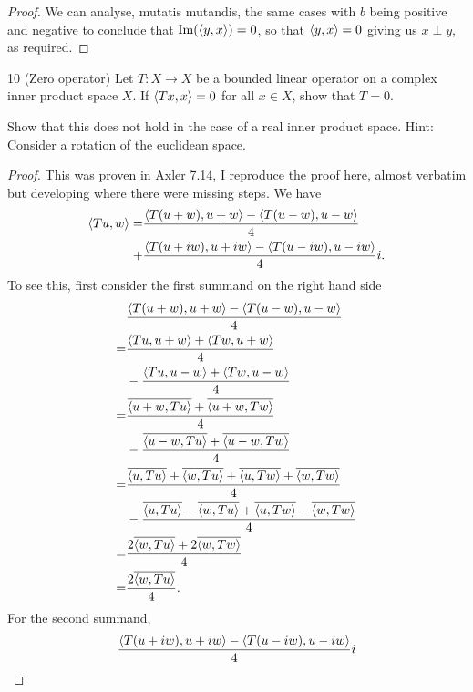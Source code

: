 \begin{proof}
We can analyse, mutatis mutandis, the same cases with $b$ being positive and negative to conclude that $\text{Im}(\langle y,x\rangle)=0$, so that $\langle y,x\rangle=0$ giving us $x\perp y$, as required.
\end{proof}

\begin{exercise}{10 (Zero operator)}
Let $T:X\to X$ be a bounded linear operator on a complex inner product space $X$.
If $\langle Tx,x\rangle=0$ for all $x\in X$, show that $T=0$.

Show that this does not hold in the case of a real inner product space.
Hint: Consider a rotation of the euclidean space.
\end{exercise}
\begin{proof}
This was proven in Axler 7.14, I reproduce the proof here, almost verbatim but developing where there were missing steps.
We have
\begin{align*}
    \langle Tu,w\rangle 
    =& \frac{\langle T(u+w), u+w\rangle-\langle T(u-w), u-w\rangle}{4}\\
    +& \frac{\langle T(u+iw), u+iw\rangle-\langle T(u-iw), u-iw\rangle}{4}i.
\end{align*}
To see this, first consider the first summand on the right hand side
\begin{align*}
    &\frac{\langle T(u+w), u+w\rangle - \langle T(u-w), u-w\rangle}{4}\\
    =& \frac{\langle Tu, u+w\rangle + \langle Tw, u+w\rangle}{4}\\
    &-\frac{\langle Tu, u-w\rangle + \langle Tw, u-w\rangle}{4}\\
    =& \frac{\overline{\langle u+w,Tu\rangle} + \overline{\langle u+w,Tw\rangle}}{4}\\
    &-\frac{\overline{\langle u-w,Tu\rangle} + \overline{\langle u-w,Tw\rangle}}{4}\\
    =& \frac{\overline{\langle u,Tu\rangle} +\overline{\langle w,Tu\rangle}
    + \overline{\langle u,Tw\rangle} +\overline{\langle w,Tw\rangle}}{4}\\
    &-\frac{\overline{\langle u,Tu\rangle} - \overline{\langle w,Tu\rangle} 
    + \overline{\langle u,Tw\rangle} - \overline{\langle w,Tw\rangle}}{4}\\
    =& \frac{2\overline{\langle w,Tu\rangle} + 2\overline{\langle w,Tw\rangle}}{4}\\
    =& \frac{2\overline{\langle w,Tu\rangle}}{4}.
\end{align*}
For the second summand,
\begin{align*}
    &\frac{\brackets{T(u+iw), u+iw} - \brackets{T(u-iw), u-iw}}{4}i\\

\end{align*}
\end{proof}
